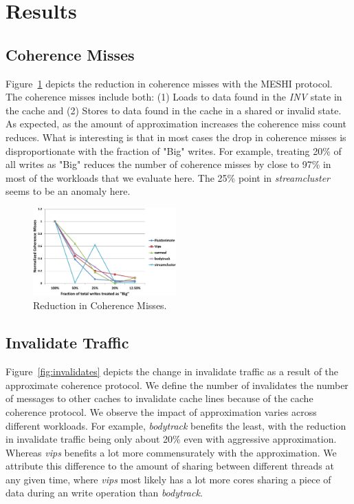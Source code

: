 \section{Results}
\label{sec:results}
\subsection{Coherence Misses}
Figure~\ref{fig:coherence} depicts the reduction in coherence misses with the
MESHI protocol. The coherence misses include both: (1) Loads to data found in
the \emph{INV} state in the cache and (2) Stores to data found in the cache in a
shared or invalid state. As expected, as the amount of approximation increases the coherence miss
count reduces. What is interesting is that in most cases the drop in coherence
misses is disproportionate with the fraction of "Big" writes. For example,
treating 20\% of all writes as "Big" reduces the number of coherence misses by
close to 97\% in most of the workloads that we evaluate here. The 25\% point in
\emph{streamcluster} seems to be an anomaly here.  
\begin{figure}[t] \centering 
\centering
\includegraphics[width=0.49\textwidth]{figures/coherence_misses-crop.pdf}
\caption{Reduction in Coherence Misses.}
\label{fig:coherence}
\end{figure}

\subsection{Invalidate Traffic}
Figure~\ref{fig:invalidates} depicts the change in invalidate traffic as a
result of the approximate coherence protocol. We define the number of
invalidates the number of messages to other caches to invalidate cache lines
because of the cache coherence protocol. We observe the impact of
approximation varies across different workloads. For example, \emph{bodytrack}
benefits the least, with the reduction in invalidate traffic being only about
20\% even with aggressive approximation. Whereas \emph{vips} benefits a lot
more commensurately with the approximation. We attribute this difference to the
amount of sharing between different threads at any given time, where \emph{vips}
most likely has a lot more cores sharing a piece of data during an write
operation than \emph{bodytrack}.  

